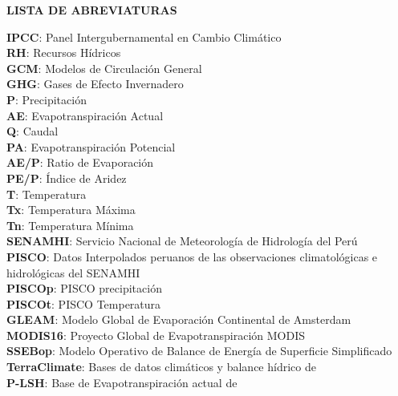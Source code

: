 \documentclass[12pt]{article}
\begin{document}
	

\clearpage

\tableofcontents
\clearpage
\listoffigures
\clearpage
\listoftables
\clearpage
\listofappendices
\clearpage

\begin{center}
\large{\textbf {LISTA DE ABREVIATURAS}}
\end{center}

\textbf{IPCC}: Panel Intergubernamental en Cambio Climático \\
\textbf{RH}: Recursos Hídricos \\
\textbf{GCM}: Modelos de Circulación General \\
\textbf{GHG}: Gases de Efecto Invernadero \\
\textbf{P}: Precipitación \\
\textbf{AE}: Evapotranspiración Actual \\
\textbf{Q}: Caudal \\
\textbf{PA}: Evapotranspiración Potencial \\
\textbf{AE/P}: Ratio de Evaporación \\
\textbf{PE/P}: Índice de Aridez \\
\textbf{T}: Temperatura \\
\textbf{Tx}: Temperatura Máxima \\
\textbf{Tn}: Temperatura Mínima \\
\textbf{SENAMHI}: Servicio Nacional de Meteorología de Hidrología del Perú \\
\textbf{PISCO}: Datos Interpolados peruanos de las observaciones climatológicas e hidrológicas del SENAMHI \\
\textbf{PISCOp}: PISCO precipitación \\
\textbf{PISCOt}: PISCO Temperatura \\
\textbf{GLEAM}: Modelo Global de Evaporación Continental de Amsterdam \citep{Martens2017} \\
\textbf{MODIS16}: Proyecto Global de Evapotranspiración MODIS \citep{mu2013modis} \\
\textbf{SSEBop}: Modelo Operativo de Balance de Energía de Superficie Simplificado \\
\textbf{TerraClimate}: Bases de datos climáticos y balance hídrico de \citet{abatzoglou2018terraclimate}\\
\textbf{P-LSH}: Base de Evapotranspiración actual de \citet{zhang2015vegetation} \\
\end{document}

